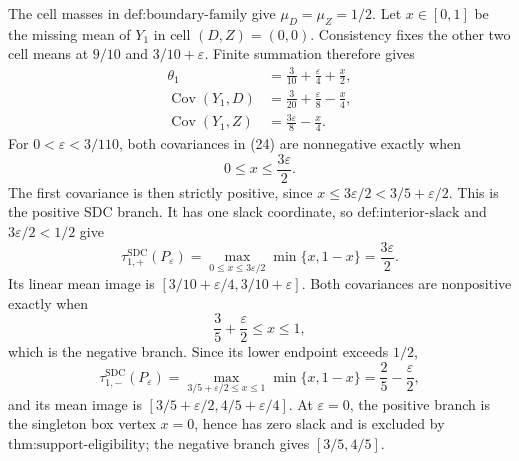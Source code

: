 The cell masses in \(\text{def:boundary-family}\) give \(\mu_D=\mu_Z=1/2\).  Let \(x\in[0,1]\) be the missing mean of \(Y_1\) in cell \((D,Z)=(0,0)\).  Consistency fixes the other two cell means at \(9/10\) and \(3/10+\varepsilon\).  Finite summation therefore gives
\[
 \begin{aligned}
 \theta_1&=\frac{3}{10}+\frac{\varepsilon}{4}+\frac{x}{2},\\
 \operatorname{Cov}(Y_1,D)&=\frac{3}{20}+\frac{\varepsilon}{8}-\frac{x}{4},\\
 \operatorname{Cov}(Y_1,Z)&=\frac{3\varepsilon}{8}-\frac{x}{4}.
 \end{aligned}                                                    \tag{24}
\]
For \(0<\varepsilon<3/110\), both covariances in (24) are nonnegative exactly when
\[
 0\le x\le\frac{3\varepsilon}{2}.
\]
The first covariance is then strictly positive, since \(x\le3\varepsilon/2<3/5+\varepsilon/2\).  This is the positive SDC branch.  It has one slack coordinate, so \(\text{def:interior-slack}\) and \(3\varepsilon/2<1/2\) give
\[
 \tau_{1,+}^{\mathrm{SDC}}(P_\varepsilon)
 =\max_{0\le x\le3\varepsilon/2}\min\{x,1-x\}
 =\frac{3\varepsilon}{2}.                                      \tag{25}
\]
Its linear mean image is \([3/10+\varepsilon/4,3/10+\varepsilon]\).  Both covariances are nonpositive exactly when
\[
 \frac35+\frac{\varepsilon}{2}\le x\le1,
\]
which is the negative branch.  Since its lower endpoint exceeds \(1/2\),
\[
 \tau_{1,-}^{\mathrm{SDC}}(P_\varepsilon)
 =\max_{3/5+\varepsilon/2\le x\le1}\min\{x,1-x\}
 =\frac25-\frac{\varepsilon}{2},                                \tag{26}
\]
and its mean image is \([3/5+\varepsilon/2,4/5+\varepsilon/4]\).  At \(\varepsilon=0\), the positive branch is the singleton box vertex \(x=0\), hence has zero slack and is excluded by \(\text{thm:support-eligibility}\); the negative branch gives \([3/5,4/5]\).

